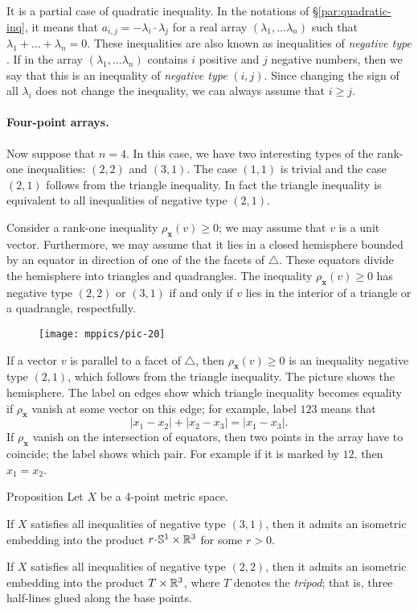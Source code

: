 \documentclass[a4paper,10pt]{article}
\begin{document}
It is a partial case of quadratic inequality.
In the notations of §\ref{par:quadratic-inq}, it means that $a_{i,j}=-\lambda_i\cdot\lambda_j$ for a real array $(\lambda_1,\dots \lambda_n)$ such that 
$\lambda_1+\dots+\lambda_n=0$.
These inequalities are also known as inequalities of \emph{negative type} \cite{deza-lauren}.
If in the array $(\lambda_1,\dots \lambda_n)$ contains $i$ positive and $j$ negative numbers,
then we say that this is an inequality of \emph{negative type} $(i,j)$.
Since changing the sign of all $\lambda_i$ does not change the inequality, we can always assume that $i\ge j$.

\paragraph{Four-point arrays.}\label{Four-point arrays}
Now suppose that $n=4$.
In this case, we have two interesting types of the rank-one inequalities: $(2,2)$ and $(3,1)$.
The case $(1,1)$ is trivial and 
the case $(2,1)$ follows from the triangle inequality.
In fact the triangle inequality is equivalent to all inequalities of negative type $(2,1)$.

Consider a rank-one inequality $\rho_{\bm{x}}(v)\ge 0$; we may assume that $v$ is a unit vector.
Furthermore, we may assume that it lies in a closed hemisphere bounded by an equator in direction of one of the the facets of $\triangle$.
These equators divide the hemisphere into triangles and quadrangles.
The inequality $\rho_{\bm{x}}(v)\ge 0$ has negative type $(2,2)$ or $(3,1)$
if and only if $v$ lies in the interior of a triangle or a quadrangle, respectfully.

\begin{wrapfigure}{o}{36mm}
\centering
\vskip-4mm
\texttt{[image: mppics/pic-20]}
\vskip-0mm
\end{wrapfigure}

If a vector $v$ is parallel to a facet of $\triangle$, then $\rho_{\bm{x}}(v)\ge 0$ is an inequality negative type $(2,1)$, which follows from the triangle inequality.
The picture shows the hemisphere.
The label on edges show which triangle inequality becomes equality if $\rho_{\bm{x}}$ vanish at some vector on this edge;
for example, label $123$ means that
\[|x_1-x_2|+|x_2-x_3|=|x_1-x_3|.\]
If $\rho_{\bm{x}}$ vanish on the intersection of equators, then two points in the array have to coincide;
the label shows which pair.
For example if it is marked by $12$, then $x_1=x_2$.

\begin{thm}{Proposition}
Let $X$ be a 4-point metric space.

If $X$ satisfies all inequalities of negative type $(3, 1)$, then it admits an isometric embedding into the product $r\cdot \mathbb{S}^1\times\RR^3$ for some $r>0$.

If $X$ satisfies all inequalities of negative type $(2, 2)$, then it admits an isometric embedding into the product $T\times\mathbb{R}^3$, where $T$ denotes the \emph{tripod};
that is, three half-lines glued along the base points.
\end{thm}
\end{document}
